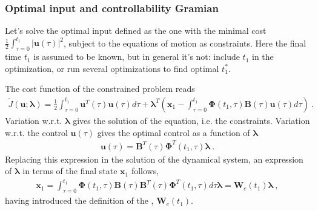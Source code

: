 \documentclass[letterpaper,10pt,english]{jupyterBook}
\begin{document}
\subsubsection*{Optimal input and controllability Gramian }

\sphinxAtStartPar
Let’s solve the optimal input defined as the one with the minimal cost \(\frac{1}{2}\int_{\tau=0}^{t_1} \left| \mathbf{u}(\tau) \right|^2\), subject to the equations of motion as constraints.  Here the final time \(t_1\) is assumed to be known, but in general it’s not: include \(t_1\) in the optimization, or run several optimizations to find optimal \(t_1^*\).

\sphinxAtStartPar
The cost function of the constrained problem reads
\begin{equation*}
\begin{split}\widetilde{J}(\mathbf{u};\boldsymbol\lambda) = \frac{1}{2} \int_{\tau=0}^{t_1} \mathbf{u}^T(\tau) \mathbf{u}(\tau) d \tau + \boldsymbol\lambda^T \left( \mathbf{x}_1 - \int_{\tau=0}^{t_1} \boldsymbol\Phi(t_1,\tau) \mathbf{B}(\tau) \mathbf{u}(\tau) d \tau \right) \ .\end{split}
\end{equation*}
\sphinxAtStartPar
Variation w.r.t. \(\boldsymbol\lambda\) gives the solution of the equation, i.e. the constraints. Variation w.r.t. the control \(\mathbf{u}(\tau)\) gives the optimal control as a function of \(\boldsymbol\lambda\)
\begin{equation*}
\begin{split}\mathbf{u}(\tau) = \mathbf{B}^T(\tau) \boldsymbol\Phi^T(t_1,\tau) \boldsymbol\lambda \ .\end{split}
\end{equation*}
\sphinxAtStartPar
Replacing this expression in the solution of the dynamical system, an expression of \(\boldsymbol\lambda\) in terms of the final state \(\mathbf{x}_1\) follows,
\begin{equation*}
\begin{split}\mathbf{x}_1 = \int_{\tau=0}^{t_1} \boldsymbol\Phi(t_1,\tau) \mathbf{B}(\tau) \mathbf{B}^T(\tau)\boldsymbol\Phi^T(t_1,\tau) d \tau \boldsymbol\lambda = \mathbf{W}_c(t_1) \boldsymbol\lambda \ ,\end{split}
\end{equation*}
\sphinxAtStartPar
having introduced the definition of the , \(\mathbf{W}_c(t_1)\).
\end{document}
